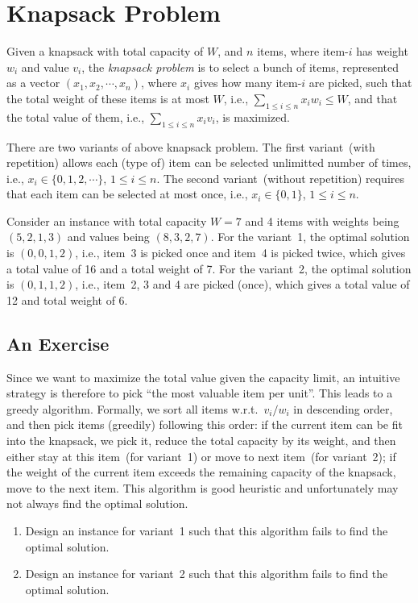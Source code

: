 \setcounter{definition}{0} \setcounter{property}{0} \setcounter{claim}{0} \setcounter{fact}{0} \setcounter{corollary}{0} \setcounter{figure}{0}
\section{Knapsack Problem}

Given a knapsack with total capacity of $W$, and $n$ items, where item-$i$ has weight $w_i$ and value $v_i$,
the \emph{knapsack problem} is to select a bunch of items, represented as a vector $(x_1, x_2, \cdots, x_n)$,
where $x_i$ gives how many item-$i$ are picked, such that
the total weight of these items is at most $W$, i.e., $\sum_{1\le i \le n} x_iw_i \le W$,
and that the total value of them, i.e., $\sum_{1\le i \le n} x_i v_i$, is maximized.

There are two variants of above knapsack problem. 
The first variant~(with repetition) allows each (type of) item can be
selected unlimitted number of times, i.e., $x_i \in \{0, 1, 2, \cdots \}$, $1\le i \le n$.
The second variant~(without repetition) requires that each item can be
selected at most once, i.e., $x_i \in \{0, 1\}$, $1\le i \le n$.

Consider an instance with total capacity $W = 7$ and 4 items with weights being $(5, 2, 1, 3)$
and values being $(8, 3, 2, 7)$. 
For the variant~1, the optimal solution is $(0, 0, 1, 2)$, i.e.,
item~3 is picked once and item~4 is picked twice, which gives a total value of 16 and a total weight of 7.
For the variant~2, the optimal solution is $(0, 1, 1, 2)$, i.e.,
item~2, 3 and 4 are picked (once), which gives a total value of 12 and total weight of 6.

\subsection*{An Exercise}

Since we want to maximize the total value given the capacity limit,
an intuitive strategy is therefore to pick ``the most valuable item per unit''.
This leads to a greedy algorithm. Formally, we sort all items w.r.t.\ $v_i/w_i$ in descending order,
and then pick items (greedily) following this order: if the current item can be fit into the knapsack,
we pick it, reduce the total capacity by its weight, and then either stay at this item~(for variant~1) or move to next item~(for variant~2);
if the weight of the current item exceeds the remaining capacity of the knapsack, move to the next item. 
This algorithm is good heuristic and unfortunately may not always find the optimal solution.
\begin{enumerate}
\item Design an instance for variant~1 such that this algorithm fails to find the optimal solution.
\item Design an instance for variant~2 such that this algorithm fails to find the optimal solution.
\end{enumerate}

